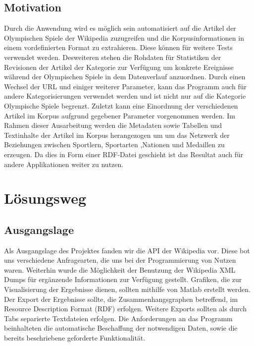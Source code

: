 \documentclass[pagesize=auto, titlepage=on]{scrartcl}
\begin{document}
\subsection{Motivation}
\label{sec:motivation}
Durch die Anwendung wird es möglich sein automatisiert auf die Artikel der Olympischen Spiele der Wikipedia zuzugreifen und die Korpusinformationen in einem vordefinierten Format zu extrahieren. Diese können für weitere Tests verwendet werden.
Desweiteren stehen die Rohdaten für Statistiken der Revisionen der Artikel der Kategorie zur Verfügung um konkrete Ereignisse während der Olympischen Spiele in dem Datenverlauf anzuordnen.
Durch einen Wechsel der URL und einiger weiterer Parameter, kann das Programm auch für andere Kategorisierungen verwendet werden und ist nicht nur auf die Kategorie Olympische Spiele begrenzt.
Zuletzt kann eine Einordnung der verschiedenen Artikel im Korpus aufgrund gegebener Parameter vorgenommen werden.
Im Rahmen dieser Ausarbeitung werden die Metadaten sowie Tabellen und Textinhalte der Artikel im Korpus herangezogen um um das Netzwerk der Beziehungen zwischen Sportlern, Sportarten ,Nationen und Medaillen zu erzeugen. Da dies in Form einer RDF-Datei geschieht ist das Resultat auch für andere Applikationen weiter zu nutzen.

\section{Lösungsweg}
\label{sec:ansatz}

\subsection{Ausgangslage}
\label{sec:ausgangslage}
Als Ausgangslage des Projektes fanden wir die API der Wikipedia vor. Diese bot uns verschiedene Anfragearten, die uns bei der Programmierung von Nutzen waren. Weiterhin wurde die Möglichkeit der Benutzung der Wikipedia XML Dumps für ergänzende Informationen zur Verfügung gestellt. Grafiken, die zur Visualisierung der Ergebnisse dienen, sollten mithilfe von Matlab erstellt werden. Der Export der Ergebnisse sollte, die Zusammenhangsgraphen betreffend, im Resource Description Format (RDF) erfolgen. Weitere Exports sollten als durch Tabs separierte Textdateien erfolgen.
Die Anforderungen an das Programm beinhalteten die automatische Beschaffung der notwendigen Daten, sowie die bereits beschriebene geforderte Funktionalität.
\end{document}
